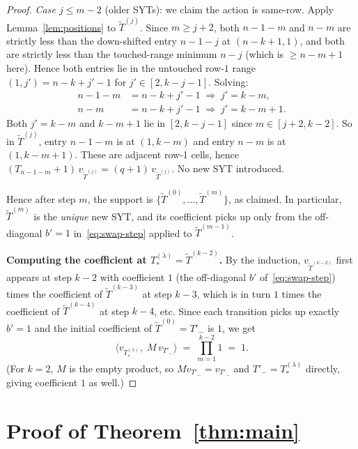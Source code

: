 \documentclass[11pt]{article}
\theoremstyle{definition}
\begin{document}
\begin{proof}
\emph{Case $j \le m - 2$} (older SYTs): we claim the action is
same-row.  Apply Lemma~\ref{lem:positions} to $\widetilde{T}^{(j)}$.
Since $m \ge j + 2$, both $n-1-m$ and $n-m$ are strictly less than the
down-shifted entry $n-1-j$ at $(n-k+1, 1)$, and both are strictly less
than the touched-range minimum $n-j$ (which is $\ge n - m + 1$ here).
Hence both entries lie in the untouched row-$1$ range $(1, j') = n-k+j'-1$
for $j' \in [2, k-j-1]$.  Solving:
\begin{align*}
   n-1-m &= n-k+j'-1 \;\Rightarrow\; j' = k - m, \\
   n-m &= n-k+j'-1 \;\Rightarrow\; j' = k - m + 1.
\end{align*}
Both $j' = k-m$ and $k-m+1$ lie in $[2, k-j-1]$ since $m \in [j+2, k-2]$.
So in $\widetilde{T}^{(j)}$, entry $n-1-m$ is at $(1, k-m)$ and entry
$n-m$ is at $(1, k-m+1)$.  These are adjacent row-1 cells, hence
$(T_{n-1-m} + 1)\, v_{\widetilde{T}^{(j)}} = (q+1)\,
v_{\widetilde{T}^{(j)}}$.  No new SYT introduced.

Hence after step $m$, the support is
$\{\widetilde{T}^{(0)}, \ldots, \widetilde{T}^{(m)}\}$, as claimed.
In particular, $\widetilde{T}^{(m)}$ is the \emph{unique} new SYT, and
its coefficient picks up only from the off-diagonal
$b' = 1$ in~\eqref{eq:swap-step} applied to $\widetilde{T}^{(m-1)}$.

\textbf{Computing the coefficient at $T_{*}^{(\lambda)} = \widetilde{T}^{(k-2)}$.}
By the induction, $v_{\widetilde{T}^{(k-2)}}$ first appears at step
$k - 2$ with coefficient $1$ (the off-diagonal $b'$ of~\eqref{eq:swap-step})
times the coefficient of $\widetilde{T}^{(k-3)}$ at step $k - 3$,
which is in turn $1$ times the coefficient of $\widetilde{T}^{(k-4)}$
at step $k - 4$, etc.  Since each transition picks up exactly $b' = 1$
and the initial coefficient of $\widetilde{T}^{(0)} = T'_-$ is $1$,
we get
\[
   \langle v_{T_{*}^{(\lambda)}},\; M\,v_{T'_-}\rangle
   \;=\; \prod_{m=1}^{k-2} 1 \;=\; 1.
\]
(For $k = 2$, $M$ is the empty product, so $M v_{T'_-} = v_{T'_-}$ and
$T'_- = T_{*}^{(\lambda)}$ directly, giving coefficient $1$ as well.)
\end{proof}

\section{Proof of Theorem~\ref{thm:main}}\label{sec:main}
\end{document}
